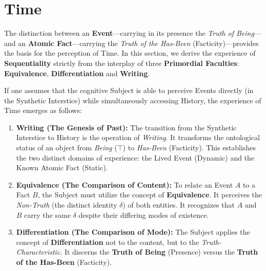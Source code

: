 \documentclass[11pt, a4paper]{article}
\theoremstyle{formalism}
\begin{document}
\section{Time}

The distinction between an \textbf{Event}---carrying in its presence the
\textit{Truth of Being}---and an \textbf{Atomic Fact}---carrying the
\textit{Truth of the Has-Been} (Facticity)---provides the basis for the
perception of Time. In this section, we derive the experience of
\textbf{Sequentiality} strictly from the interplay of three \textbf{Primordial
Faculties}: \textbf{Equivalence}, \textbf{Differentiation} and
\textbf{Writing}. 

If one assumes that the cognitive Subject is able to perceive Events directly 
(in the Synthetic Interstice) while simultaneously accessing History, the 
experience of Time emerges as follows:

\begin{enumerate}
    \item \textbf{Writing (The Genesis of Past):} The transition from the 
    Synthetic Interstice to History is the operation of \textit{Writing}. It transforms the 
    ontological status of an object from \textit{Being} ($\top$) to 
    \textit{Has-Been} (Facticity). This establishes the two distinct domains 
    of experience: the Lived Event (Dynamic) and the Known Atomic Fact (Static).

    \item \textbf{Equivalence (The Comparison of Content):} To relate an Event 
    $A$ to a Fact $B$, the Subject must utilize the concept of 
    \textbf{Equivalence}. It perceives the \textit{Non-Truth} (the distinct 
    identity $\delta$) of both entities. It recognizes that $A$ and $B$ carry
    the same $\delta$ despite their differing modes of existence.

    \item \textbf{Differentiation (The Comparison of Mode):} The Subject 
    applies the concept of \textbf{Differentiation} not to the content, but to 
    the \textit{Truth-Characteristic}. It discerns the \textbf{Truth of Being} 
    (Presence) versus the \textbf{Truth of the Has-Been} (Facticity).
\end{enumerate}
\end{document}
